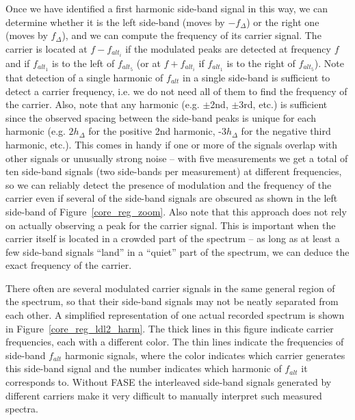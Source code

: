 Once we have identified a first harmonic side-band signal in this way, we can determine whether it is the left side-band (moves by $-f_\Delta$) or the right one (moves by $f_\Delta$), and we can compute the frequency of its carrier signal. The carrier is located at $f - f_{alt_i}$ if the modulated peaks are detected at frequency $f$ and if $f_{alt_1}$ is to the left of $f_{alt_5}$ (or at $f+f_{alt_i}$ if $f_{alt_1}$ is to the right of $f_{alt_5}$). Note that detection of a single harmonic of $f_{alt}$ in a single side-band is sufficient to detect a carrier frequency, i.e. we do not need all of them to find the frequency of the carrier. Also, note that any harmonic (e.g. $\pm$2nd, $\pm$3rd, etc.) is sufficient since the observed spacing between the side-band peaks is unique for each harmonic (e.g. $2h_\Delta$ for the positive 2nd harmonic, -$3h_\Delta$ for the negative third harmonic, etc.). This comes in handy if one or more of the signals overlap with other signals or unusually strong noise -- with five measurements we get a total of ten side-band signals (two side-bands per measurement) at different frequencies, so we can reliably detect the presence of modulation and the frequency of the carrier even if several of the side-band signals are obscured as shown in the left side-band of Figure~\ref{core_reg_zoom}. Also note that this approach does not rely on actually observing a peak for the carrier signal. This is important when the carrier itself is located in a crowded part of the spectrum -- as long as at least a few side-band signals ``land'' in a ``quiet'' part of the spectrum, we can deduce the exact frequency of the carrier.

There often are several modulated carrier signals in the same general region of the spectrum, so that their side-band signals may not be neatly separated from each other. A simplified representation of one actual recorded spectrum is shown in Figure~\ref{core_reg_ldl2_harm}. The thick lines in this figure indicate carrier frequencies, each with a different color. The thin lines indicate the frequencies of side-band $f_{alt}$ harmonic signals, where the color indicates which carrier generates this side-band signal and the number indicates which harmonic of $f_{alt}$ it corresponds to. Without FASE the interleaved side-band signals generated by different carriers make it very difficult to manually interpret such measured spectra.

